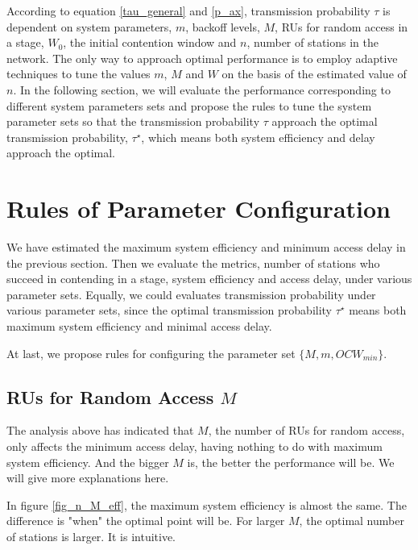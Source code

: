 According to equation \ref{tau_general} and \ref{p_ax}, transmission probability $\tau$ is dependent on system parameters, $m$, backoff levels, $M$, RUs for random access in a stage, $W_0$, the initial contention window and $n$, number of stations in the network.
The only way to approach optimal performance is to employ adaptive techniques to tune the values $m$, $M$ and $W$ on the basis of the estimated value of $n$.
In the following section, we will evaluate the performance corresponding to different system parameters sets and propose the rules to tune the system parameter sets so that the transmission probability $\tau$ approach the optimal transmission probability, $\tau^\star$, which means both system efficiency and delay approach the optimal. 

\section{Rules of Parameter Configuration} 	\label{sec_perf_eval}
We have estimated the maximum system efficiency and minimum access delay in the previous section. Then we evaluate the metrics, number of stations who succeed in contending in a stage, system efficiency and access delay, under various parameter sets. 
Equally, we could evaluates transmission probability under various parameter sets, since the optimal transmission probability $\tau^\star$ means both maximum system efficiency and minimal access delay.

At last, we propose rules for configuring the parameter set $\lbrace M,m, OCW_{min}\rbrace$.

\subsection{RUs for Random Access $M$}
The analysis above has indicated that $M$, the number of RUs for random access, only affects the minimum access delay, having nothing to do with maximum system efficiency. 
And the bigger $M$ is, the better the performance will be. We will give more explanations here. 

In figure \ref{fig_n_M_eff}, the maximum system efficiency is almost the same. 
The difference is "when" the optimal point will be. 
For larger $M$, the optimal number of stations is larger. It is intuitive.

